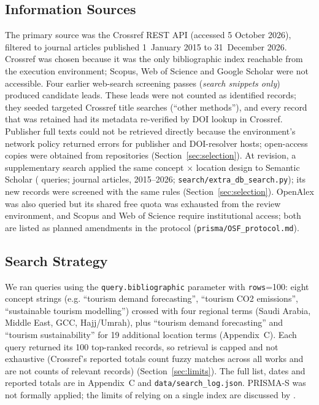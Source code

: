 \documentclass[11pt,a4paper]{article}
\begin{document}
\subsection{Information Sources}
The primary source was the Crossref REST API (accessed 5 October 2026), filtered to journal articles published 1~January 2015 to 31~December 2026. Crossref was chosen because it was the only bibliographic index reachable from the execution environment; Scopus, Web of Science and Google Scholar were not accessible. Four earlier web-search screening passes (\emph{search snippets only}) produced candidate leads. These leads were not counted as identified records; they seeded targeted Crossref title searches (``other methods''), and every record that was retained had its metadata re-verified by DOI lookup in Crossref. Publisher full texts could not be retrieved directly because the environment's network policy returned errors for publisher and DOI-resolver hosts; open-access copies were obtained from repositories (Section~\ref{sec:selection}). At revision, a supplementary search applied the same concept $\times$ location design to Semantic Scholar (\Nsqueries{} queries; journal articles, 2015--2026; \texttt{search/extra\_db\_search.py}); its new records were screened with the same rules (Section~\ref{sec:selection}). OpenAlex was also queried but its shared free quota was exhausted from the review environment, and Scopus and Web of Science require institutional access; both are listed as planned amendments in the protocol (\texttt{prisma/OSF\_protocol.md}).

\subsection{Search Strategy}
We ran \Nqueries{} queries using the \texttt{query.bibliographic} parameter with \texttt{rows}=100: eight concept strings (e.g. ``tourism demand forecasting'', ``tourism CO2 emissions'', ``sustainable tourism modelling'') crossed with four regional terms (Saudi Arabia, Middle East, GCC, Hajj/Umrah), plus ``tourism demand forecasting'' and ``tourism sustainability'' for 19 additional location terms (Appendix~C). Each query returned its 100 top-ranked records, so retrieval is capped and not exhaustive (Crossref's reported totals count fuzzy matches across all works and are not counts of relevant records) (Section~\ref{sec:limits}). The full list, dates and reported totals are in Appendix~C and \texttt{data/search\_log.json}. PRISMA-S was not formally applied; the limits of relying on a single index are discussed by \citet{Gusenbauer2020}.
\end{document}
